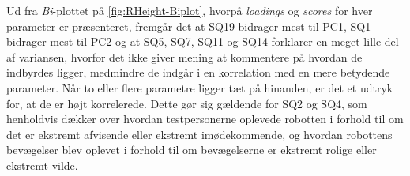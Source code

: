 \noindent
%
Ud fra \textit{Bi}-plottet på \autoref{fig:RHeight-Biplot}, hvorpå \textit{loadings} og \textit{scores} for hver parameter er præsenteret, fremgår det at SQ19 bidrager mest til PC1, SQ1 bidrager mest til PC2 og at SQ5, SQ7, SQ11 og SQ14 forklarer en meget lille del af variansen, hvorfor det ikke giver mening at kommentere på hvordan de indbyrdes ligger, medmindre de indgår i en korrelation med en mere betydende parameter. Når to eller flere parametre ligger tæt på hinanden, er det et udtryk for, at de er højt korrelerede. Dette gør sig gældende for SQ2 og SQ4, som henholdvis dækker over hvordan testpersonerne oplevede robotten i forhold til om det er ekstremt afvisende eller ekstremt imødekommende, og hvordan robottens bevægelser blev oplevet i forhold til om bevægelserne er ekstremt rolige eller ekstremt vilde.  


